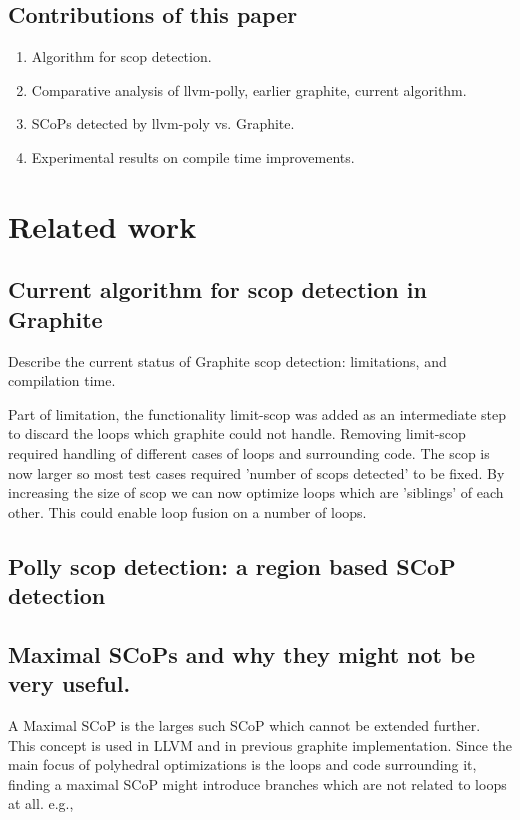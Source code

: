 \documentclass{sigplanconf}
\begin{document}
\subsection{Contributions of this paper}
\begin{enumerate}
  \item Algorithm for scop detection.
  \item Comparative analysis of llvm-polly, earlier graphite, current algorithm.
  \item SCoPs detected by llvm-poly vs. Graphite.
  \item Experimental results on compile time improvements.
\end{enumerate}



\section{Related work}

\subsection{Current algorithm for scop detection in Graphite}

Describe the current status of Graphite scop detection: limitations, and compilation time.

Part of limitation, the functionality limit-scop was added as an intermediate
step to discard the loops which graphite could not handle. Removing limit-scop
required handling of different cases of loops and surrounding code.  The scop is
now larger so most test cases required 'number of scops detected' to be
fixed. By increasing the size of scop we can now optimize loops which are
'siblings' of each other. This could enable loop fusion on a number of loops.

\subsection{Polly scop detection: a region based SCoP detection}

\subsection{Maximal SCoPs and why they might not be very useful.}
A Maximal SCoP is the larges such SCoP which cannot be extended further. This concept is used
in LLVM 
and in previous graphite implementation.
Since the main focus of
polyhedral optimizations is the loops and code surrounding it, finding a maximal SCoP might introduce branches
which are not related to loops at all. e.g.,
\end{document}
